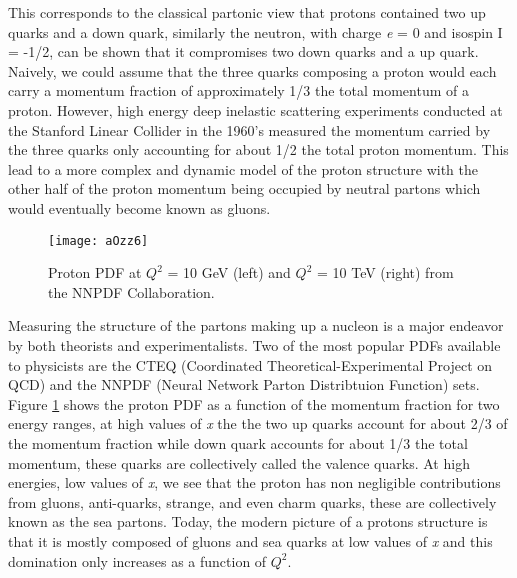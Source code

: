 \noindent
This corresponds to the classical partonic view that protons contained two up quarks and a down quark, similarly the neutron, with charge \textit{e} = 0 and isospin I = -1/2, can be shown that it compromises two down quarks and a up quark.  Naively, we could assume that the three quarks composing a proton would each carry a momentum fraction of approximately 1/3 the total momentum of a proton.  However, high energy deep inelastic scattering experiments conducted at the Stanford Linear Collider in the 1960's\cite{Panofsky:871460} measured the momentum carried by the three quarks only accounting for about 1/2 the total proton momentum.  This lead to a more complex and dynamic model of the proton structure with the other half of the proton momentum being occupied by neutral partons which would eventually become known as gluons.

\begin{figure}[h]
\texttt{[image: aOzz6]}
\centering
\caption{Proton PDF at $Q^{2}$ = 10 GeV (left) and  $Q^{2}$ = 10 TeV (right) from the NNPDF Collaboration\cite{Feltesse:2010}.}
\label{fig:PDFNNPDF}
\end{figure}

Measuring the structure of the partons making up a nucleon is a major endeavor by both theorists and experimentalists.  Two of the most popular PDFs available to physicists are the CTEQ\cite{Kovarik:2013sya} (Coordinated Theoretical-Experimental Project on QCD) and the NNPDF\cite{Ball:1966481} (Neural Network Parton Distribtuion Function) sets.  Figure \ref{fig:PDFNNPDF} shows the proton PDF as a function of the momentum fraction for two energy ranges, at high values of \textit{x} the the two up quarks account for about 2/3 of the momentum fraction while down quark accounts for about 1/3 the total momentum, these quarks are collectively called the valence quarks.  At high energies, low values of \textit{x}, we see that the proton has non negligible contributions from gluons, anti-quarks, strange, and even charm quarks, these are collectively known as the sea partons.  Today, the modern picture of a protons structure is that it is mostly composed of gluons and sea quarks at low values of \textit{x} and this domination only increases as a function of $Q^{2}$\cite{Fritzsch:1992mu}.

